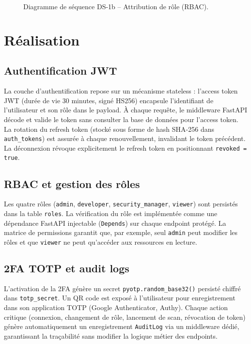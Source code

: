 \begin{figure}[H]
\centering
\fbox{\rule{0pt}{2in}\rule{0.9\linewidth}{0pt}}
\caption{Diagramme de séquence DS-1b -- Attribution de rôle (RBAC).}
\label{fig:sprint1-seq-rbac}
\end{figure}

\section{Réalisation}

\subsection{Authentification JWT}
La couche d'authentification repose sur un mécanisme stateless : l'access token JWT (durée de vie 30 minutes, signé HS256) encapsule l'identifiant de l'utilisateur et son rôle dans le payload. À chaque requête, le middleware FastAPI décode et valide le token sans consulter la base de données pour l'access token. La rotation du refresh token (stocké sous forme de hash SHA-256 dans \texttt{auth\_tokens}) est assurée à chaque renouvellement, invalidant le token précédent. La déconnexion révoque explicitement le refresh token en positionnant \texttt{revoked = true}.

\subsection{RBAC et gestion des rôles}
Les quatre rôles (\texttt{admin}, \texttt{developer}, \texttt{security\_manager}, \texttt{viewer}) sont persistés dans la table \texttt{roles}. La vérification du rôle est implémentée comme une dépendance FastAPI injectable (\texttt{Depends}) sur chaque endpoint protégé. La matrice de permissions garantit que, par exemple, seul \texttt{admin} peut modifier les rôles et que \texttt{viewer} ne peut qu'accéder aux ressources en lecture.

\subsection{2FA TOTP et audit logs}
L'activation de la 2FA génère un secret \texttt{pyotp.random\_base32()} persisté chiffré dans \texttt{totp\_secret}. Un QR code est exposé à l'utilisateur pour enregistrement dans son application TOTP (Google Authenticator, Authy). Chaque action critique (connexion, changement de rôle, lancement de scan, révocation de token) génère automatiquement un enregistrement \texttt{AuditLog} via un middleware dédié, garantissant la traçabilité sans modifier la logique métier des endpoints.

